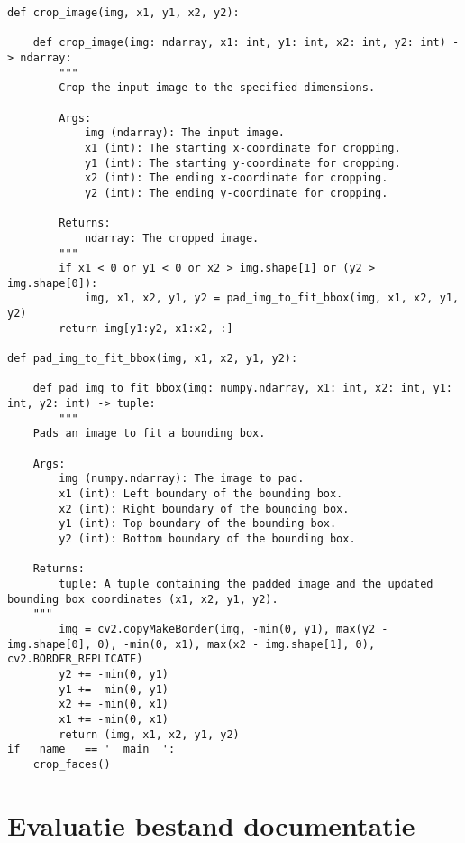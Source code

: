 \begin{verbatim}
def crop_image(img, x1, y1, x2, y2):

    def crop_image(img: ndarray, x1: int, y1: int, x2: int, y2: int) -> ndarray:
        """
        Crop the input image to the specified dimensions.

        Args:
            img (ndarray): The input image.
            x1 (int): The starting x-coordinate for cropping.
            y1 (int): The starting y-coordinate for cropping.
            x2 (int): The ending x-coordinate for cropping.
            y2 (int): The ending y-coordinate for cropping.

        Returns:
            ndarray: The cropped image.
        """
        if x1 < 0 or y1 < 0 or x2 > img.shape[1] or (y2 > img.shape[0]):
            img, x1, x2, y1, y2 = pad_img_to_fit_bbox(img, x1, x2, y1, y2)
        return img[y1:y2, x1:x2, :]

def pad_img_to_fit_bbox(img, x1, x2, y1, y2):

    def pad_img_to_fit_bbox(img: numpy.ndarray, x1: int, x2: int, y1: int, y2: int) -> tuple:
        """
    Pads an image to fit a bounding box.

    Args:
        img (numpy.ndarray): The image to pad.
        x1 (int): Left boundary of the bounding box.
        x2 (int): Right boundary of the bounding box.
        y1 (int): Top boundary of the bounding box.
        y2 (int): Bottom boundary of the bounding box.

    Returns:
        tuple: A tuple containing the padded image and the updated bounding box coordinates (x1, x2, y1, y2).
    """
        img = cv2.copyMakeBorder(img, -min(0, y1), max(y2 - img.shape[0], 0), -min(0, x1), max(x2 - img.shape[1], 0), cv2.BORDER_REPLICATE)
        y2 += -min(0, y1)
        y1 += -min(0, y1)
        x2 += -min(0, x1)
        x1 += -min(0, x1)
        return (img, x1, x2, y1, y2)
if __name__ == '__main__':
    crop_faces()
\end{verbatim}

\section{Evaluatie bestand documentatie}
\label{bijlage:evaluatie-bestand-documentatie}


